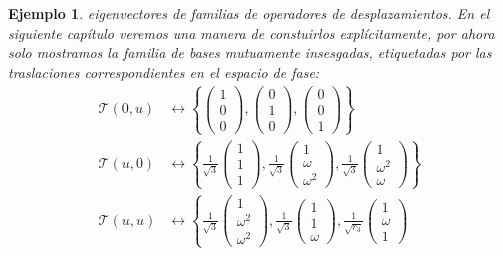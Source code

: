 \documentclass[a4paper,11pt]{report}
\newtheorem{example}{Ejemplo}
\begin{document}
\begin{example}
    eigenvectores de familias de operadores de
    desplazamientos. En el siguiente capítulo veremos una
    manera de constuirlos explícitamente, por ahora solo
    mostramos la familia de bases mutuamente insesgadas,
    etiquetadas por las traslaciones correspondientes en el
    espacio de fase:
    \begin{align}
      \mathcal T(0,u)
      &\leftrightarrow \left\{
      \begin{pmatrix} 1\\0\\0 \end{pmatrix},
      \begin{pmatrix} 0\\1\\0 \end{pmatrix},
      \begin{pmatrix} 0\\0\\1 \end{pmatrix} 
      \right\} \\
      \mathcal T(u,0)
      &\leftrightarrow \left\{
        \frac{1}{\sqrt{3}}
        \begin{pmatrix} 1\\1\\1 \end{pmatrix},
        \frac{1}{\sqrt{3}}
        \begin{pmatrix} 1\\ \omega\\ \omega^2 \end{pmatrix},
        \frac{1}{\sqrt{3}}
        \begin{pmatrix} 1\\ \omega^2\\ \omega \end{pmatrix} 
      \right\} \\
      \mathcal T(u,u)
      &\leftrightarrow \left\{
        \frac{1}{\sqrt{3}}
        \begin{pmatrix} 1\\ \omega^2 \\ \omega^2
        \end{pmatrix},
        \frac{1}{\sqrt{3}}
        \begin{pmatrix} 1\\1\\ \omega \end{pmatrix},
        \frac{1}{\sqrt{r_3}}
        \begin{pmatrix} 1\\ \omega\\ 1 \end{pmatrix}

\end{align}
\end{example}
\end{document}
